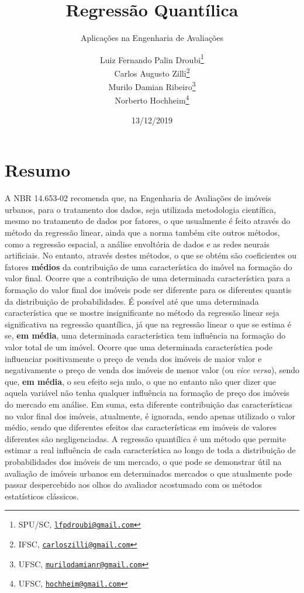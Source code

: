 \documentclass[a4paper, 12pt]{article}
\title{Regressão Quantílica}
\subtitle{Aplicações na Engenharia de Avaliações}
\author{Luiz Fernando Palin Droubi\footnote{SPU/SC,
  \href{mailto:lfpdroubi@gmail.com}{\nolinkurl{lfpdroubi@gmail.com}}} \\ Carlos Augusto Zilli\footnote{IFSC,
  \href{mailto:carloszilli@gmail.com}{\nolinkurl{carloszilli@gmail.com}}} \\ Murilo Damian Ribeiro\footnote{UFSC,
  \href{mailto:murilodamianr@gmail.com}{\nolinkurl{murilodamianr@gmail.com}}
} \\ Norberto Hochheim\footnote{UFSC,
  \href{mailto:hochheim@gmail.com}{\nolinkurl{hochheim@gmail.com}}}}
\date{13/12/2019}
\begin{document}
\maketitle

\hypertarget{resumo}{%
\section*{Resumo}\label{resumo}}

A NBR 14.653-02 recomenda que, na Engenharia de Avaliações de imóveis
urbanos, para o tratamento dos dados, seja utilizada metodologia
científica, mesmo no tratamento de dados por fatores, o que usualmente é
feito através do método da regressão linear, ainda que a norma também
cite outros métodos, como a regressão espacial, a análise envoltória de
dados e as redes neurais artificiais. No entanto, através destes
métodos, o que se obtém são coeficientes ou fatores \textbf{médios} da
contribuição de uma característica do imóvel na formação do valor final.
Ocorre que a contribuição de uma determinada característica para a
formação do valor final dos imóveis pode ser diferente para os
diferentes quantis da distribuição de probabilidades. É possível até que
uma determinada característica que se mostre insignificante no método da
regressão linear seja significativa na regressão quantílica, já que na
regressão linear o que se estima é se, \textbf{em média}, uma
determinada característica tem influência na formação do valor total de
um imóvel. Ocorre que uma determinada característica pode influenciar
positivamente o preço de venda dos imóveis de maior valor e
negativamente o preço de venda dos imóveis de menor valor (ou \emph{vice
versa}), sendo que, \textbf{em média}, o seu efeito seja nulo, o que no
entanto não quer dizer que aquela variável não tenha qualquer influência
na formação de preço dos imóveis do mercado em análise. Em suma, esta
diferente contribuição das características no valor final dos imóveis,
atualmente, é ignorada, sendo apenas utilizado o valor médio, sendo que
diferentes efeitos das características em imóveis de valores diferentes
são negligenciadas. A regressão quantílica é um método que permite
estimar a real influência de cada característica ao longo de toda a
distribuição de probabilidades dos imóveis de um mercado, o que pode se
demonstrar útil na avaliação de imóveis urbanos em determinados mercados
o que atualmente pode passar despercebido aos olhos do avaliador
acostumado com os métodos estatísticos clássicos.
\end{document}
